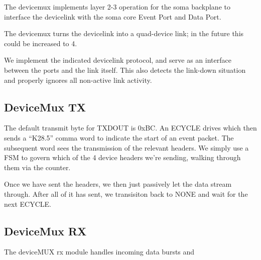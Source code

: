 The devicemux implements layer 2-3 operation for the soma backplane to
interface the devicelink with the soma core Event Port and Data Port. 

The devicemux turns the devicelink into a quad-device link; in the
future this could be increased to 4.

We implement the indicated devicelink protocol, and serve as an
interface between the ports and the link itself. This also detects the
link-down situation and properly ignores all non-active link activity.

\subsection{DeviceMux TX}
The default transmit byte for TXDOUT is 0xBC. An ECYCLE drives
 which then sends a ``K28.5'' comma word to indicate
the start of an event packet. The subsequent word sees the
transmission of the relevant headers. We simply use a FSM to govern
which of the 4 device headers we're sending, walking through them via
the  counter.

Once we have sent the headers, we then just passively let the data stream through. After all of it has sent, we transisiton back to NONE and wait for the next ECYCLE. 

\subsection{DeviceMux RX}

The deviceMUX rx module handles incoming data bursts and 
